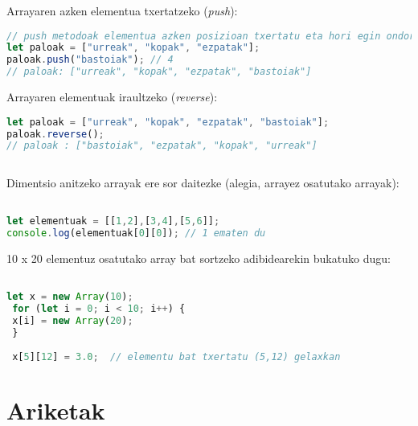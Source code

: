  Arrayaren azken elementua txertatzeko (\textit{push}):

\begin{minipage}{\linewidth}
\begin{lstlisting}[language=JavaScript]
// push metodoak elementua azken posizioan txertatu eta hori egin ondoren arrayan zenbat elementu dauden bueltatzen du
let paloak = ["urreak", "kopak", "ezpatak"];
paloak.push("bastoiak"); // 4
// paloak: ["urreak", "kopak", "ezpatak", "bastoiak"]
\end{lstlisting}
\end{minipage}

  Arrayaren elementuak iraultzeko (\textit{reverse}):

\begin{minipage}{\linewidth}
\begin{lstlisting}[language=JavaScript]
let paloak = ["urreak", "kopak", "ezpatak", "bastoiak"];
paloak.reverse();
// paloak : ["bastoiak", "ezpatak", "kopak", "urreak"]
 
\end{lstlisting}
\end{minipage}


Dimentsio anitzeko arrayak ere sor daitezke (alegia, arrayez osatutako arrayak):

\begin{minipage}{\linewidth}
\begin{lstlisting}[language=JavaScript]

let elementuak = [[1,2],[3,4],[5,6]];
console.log(elementuak[0][0]); // 1 ematen du
\end{lstlisting}
\end{minipage}

10 x 20 elementuz osatutako array bat sortzeko adibidearekin bukatuko dugu:

\begin{minipage}{\linewidth}
\begin{lstlisting}[language=JavaScript]

let x = new Array(10);
 for (let i = 0; i < 10; i++) {
 x[i] = new Array(20);
 }
 
 x[5][12] = 3.0;  // elementu bat txertatu (5,12) gelaxkan
\end{lstlisting}
\end{minipage}
 
 \section{Ariketak}



